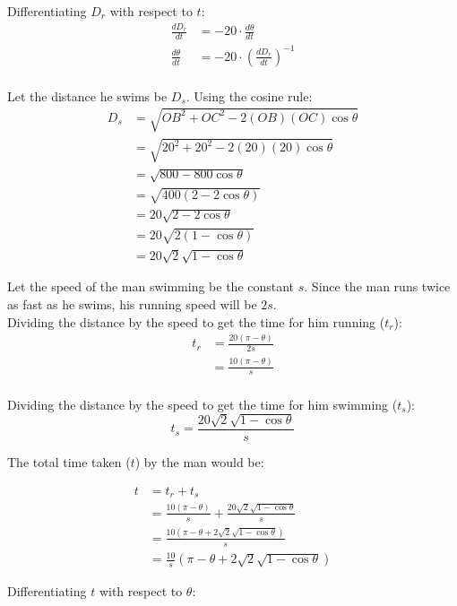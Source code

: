 \documentclass[11pt]{article}
\begin{document}
Differentiating \(D_r\) with respect to \(t\):
\begin{align*}
\frac{dD_r}{dt} &= - 20 \cdot \frac{d \theta}{dt} \\
\frac{d \theta}{dt} &= - 20 \cdot \left( \frac{dD_r}{dt} \right)^{-1} \\
\end{align*}

Let the distance he swims be \(D_s\). Using the cosine rule:
\begin{align*}
D_s &= \sqrt{OB^2 + OC^2 - 2(OB)(OC) \cos \theta} \\
&= \sqrt{20^2 + 20^2 - 2(20)(20) \cos \theta} \\
&= \sqrt{800 - 800 \cos \theta} \\
&= \sqrt{400(2 - 2 \cos \theta)} \\
&= 20 \sqrt{2 - 2 \cos \theta} \\
&= 20 \sqrt{2(1 - \cos \theta)} \\
&= 20 \sqrt{2} \sqrt{1 - \cos \theta}
\end{align*}

Let the speed of the man swimming be the constant \(s\). Since the man runs twice as fast as he swims, his running speed will be \(2s\).
\\[0pt]

Dividing the distance by the speed to get the time for him running (\(t_r\)):
\begin{align*}
t_r &= \frac{20(\pi - \theta)}{2s} \\
&= \frac{10(\pi - \theta)}{s} \\
\end{align*}

Dividing the distance by the speed to get the time for him swimming (\(t_s\)):
\[t_s = \frac{20 \sqrt{2} \sqrt{1 - \cos \theta}}{s}\]

The total time taken (\(t\)) by the man would be:

\begin{align*}
t &= t_r + t_s \\
&= \frac{10(\pi - \theta)}{s} + \frac{20 \sqrt{2} \sqrt{1 - \cos \theta}}{s} \\
&= \frac{10(\pi - \theta + 2\sqrt{2} \sqrt{1 - \cos \theta})}{s} \\
&= \frac{10}{s} \left( \pi - \theta + 2 \sqrt{2} \sqrt{1 - \cos \theta} \right)
\end{align*}

Differentiating \(t\) with respect to \(\theta\):
\end{document}
